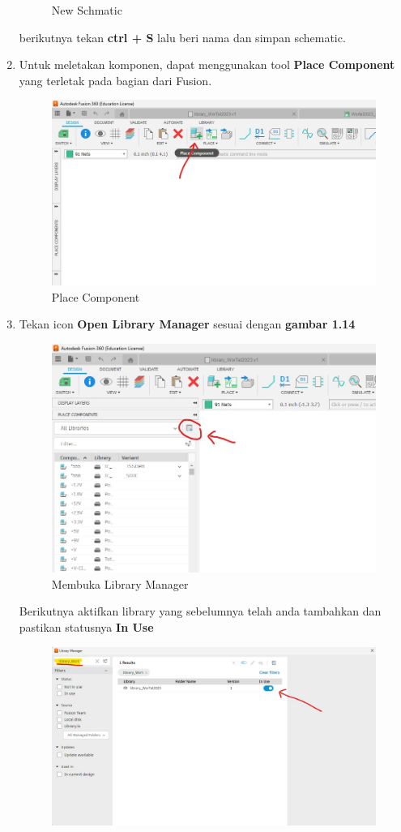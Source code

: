 \begin{enumerate}
\begin{figure}[H]
            \caption{New Schmatic} 
            \label{fig:New Schematic}
        \end{figure}
    berikutnya tekan \textbf{ctrl + S} lalu beri nama dan simpan schematic.
    \item Untuk meletakan komponen, dapat menggunakan tool \textbf{Place Component} yang terletak pada bagian dari Fusion.
        \begin{figure}[H]
            \centering
            \includegraphics[width=0.6\linewidth]{P1/img/gambar13.jpeg}
            \caption{Place Component} 
            \label{fig:Place Component}
        \end{figure}
    \item Tekan icon \textbf{Open Library Manager} sesuai dengan \textbf{gambar 1.14}
        \begin{figure}[H]
            \centering
            \includegraphics[width=0.6\linewidth]{P1/img/gambar14.jpeg}
            \caption{Membuka Library Manager} 
            \label{fig:Membuka LIbrary Manager}
        \end{figure}
    Berikutnya aktifkan library yang sebelumnya telah anda tambahkan dan pastikan statusnya \textbf{In Use}
        \begin{figure}[H]
            \centering
            \includegraphics[width=0.6\linewidth]{P1/img/gambar15.jpeg}
            

\end{figure}
\end{enumerate}
